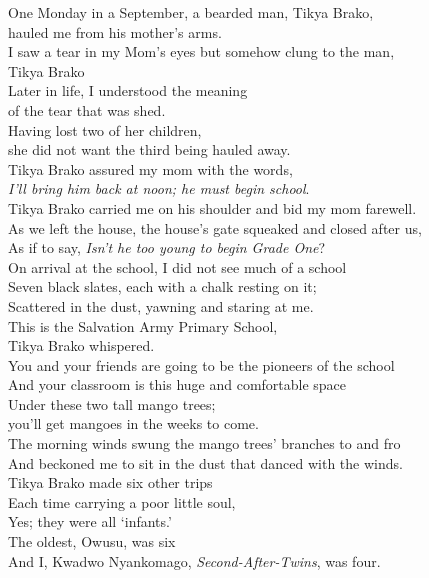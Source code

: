\begin{refsection}
\noindent One Monday in a September, a bearded man, Tikya Brako,\\
\hspace*{10mm}hauled me from his mother’s arms.\\
I saw a tear in my Mom’s eyes but somehow clung to the man,\\
\hspace*{10mm}Tikya Brako \\
Later in life, I understood the meaning\\
\hspace*{10mm}of the tear that was shed.\\
\noindent Having lost two of her children,\\
\hspace*{10mm}she did not want the third being hauled away.\\
Tikya Brako assured my mom with the words,\\
\hspace*{10mm}\textit{I’ll bring him back at noon; he must begin school}.\\
Tikya Brako carried me on his shoulder and bid my mom farewell.\\
As we left the house, the house’s gate squeaked and closed after us,\\ 
As if to say, \textit{Isn’t he too young to begin Grade One}?\\
On arrival at the school, I did not see much of a school\\
Seven black slates, each with a chalk resting on it;\\
Scattered in the dust, yawning and staring at me.\\

\noindent This is the Salvation Army Primary School,\\
\hspace*{10mm}Tikya Brako whispered.\\
You and your friends are going to be the pioneers of the school\\
And your classroom is this huge and comfortable space \\
Under these two tall mango trees;\\
\hspace*{10mm}you’ll get mangoes in the weeks to come.\\
The morning winds swung the mango trees’ branches to and fro \\
And beckoned me to sit in the dust that danced with the winds.\\
Tikya Brako made six other trips\\
Each time carrying a poor little soul, \\
Yes; they were all ‘infants.’\\
The oldest, Owusu, was six\\
And I, Kwadwo Nyankomago, \textit{Second-After-Twins}, was four.\\


\end{refsection}
